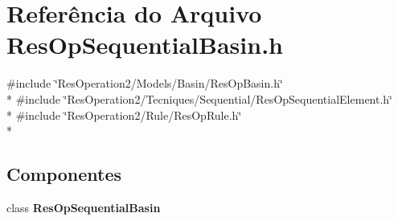 \section{Referência do Arquivo Res\+Op\+Sequential\+Basin.\+h}
\label{_res_op_sequential_basin_8h}
{\ttfamily \#include \char`\"{}Res\+Operation2/\+Models/\+Basin/\+Res\+Op\+Basin.\+h\char`\"{}}\\*
{\ttfamily \#include \char`\"{}Res\+Operation2/\+Tecniques/\+Sequential/\+Res\+Op\+Sequential\+Element.\+h\char`\"{}}\\*
{\ttfamily \#include \char`\"{}Res\+Operation2/\+Rule/\+Res\+Op\+Rule.\+h\char`\"{}}\\*
\subsection*{Componentes}
\begin{DoxyCompactItemize}
\item 
class {\bf Res\+Op\+Sequential\+Basin}
\end{DoxyCompactItemize}
